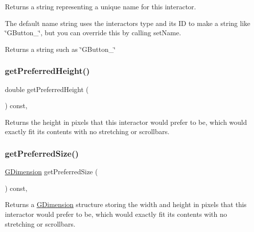 Returns a string representing a unique name for this interactor. 

The default name string uses the interactor\textquotesingle{}s type and its ID to make a string like \char`\"{}\+G\+Button\+\_\char`\"{}, but you can override this by calling set\+Name. \begin{DoxyReturn}{Returns}
a string such as \char`\"{}\+G\+Button\+\_\char`\"{} 
\end{DoxyReturn}
\mbox{\label{classGInteractor_a747de0961653847bdc6615dbf756d715}} 
\subsubsection{\texorpdfstring{get\+Preferred\+Height()}{getPreferredHeight()}}
{\footnotesize\ttfamily double get\+Preferred\+Height (\begin{DoxyParamCaption}{ }\end{DoxyParamCaption}) const\hspace{0.3cm}{\ttfamily [virtual]}, {\ttfamily [inherited]}}



Returns the height in pixels that this interactor would prefer to be, which would exactly fit its contents with no stretching or scrollbars. 

\mbox{\label{classGInteractor_a4aabbee761d8e9116275401131b7ccd1}} 
\subsubsection{\texorpdfstring{get\+Preferred\+Size()}{getPreferredSize()}}
{\footnotesize\ttfamily \mbox{\hyperlink{structGDimension}{G\+Dimension}} get\+Preferred\+Size (\begin{DoxyParamCaption}{ }\end{DoxyParamCaption}) const\hspace{0.3cm}{\ttfamily [virtual]}, {\ttfamily [inherited]}}



Returns a \mbox{\hyperlink{structGDimension}{G\+Dimension}} structure storing the width and height in pixels that this interactor would prefer to be, which would exactly fit its contents with no stretching or scrollbars. 



